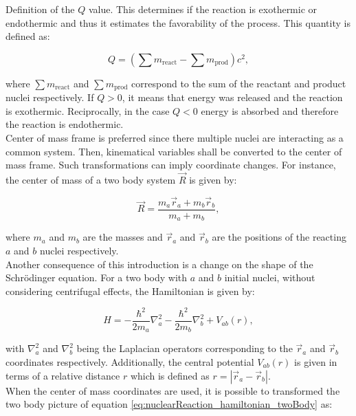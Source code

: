 \documentclass[openany]{book}
\begin{document}
Definition of the $Q$ value. This determines if the reaction is exothermic or endothermic and thus it estimates the favorability of the process. This quantity is defined as: 

\begin{equation}\label{eq:nuclearReaction_Qvalue}
	Q = (\sum m_{\mathrm{react}} - \sum m_{\mathrm{prod}})c^2,
\end{equation}

where $\sum m_{\mathrm{react}}$ and  $\sum m_{\mathrm{prod}}$ correspond to the sum of the reactant and product nuclei respectively. If $Q > 0$, it means that energy was released and the reaction is exothermic. Reciprocally, in the case $Q < 0$ energy is absorbed and therefore the reaction is endothermic.  \\

Center of mass frame is preferred since there multiple nuclei are interacting as a common system. Then, kinematical variables shall be converted to the center of mass frame. Such transformations can imply coordinate changes. For instance, the center of mass of a two body system $\vec R$ is given by: 

\begin{equation}\label{eq:nuclearReaction_centerOfMass}
	\vec R = \frac{m_a \vec r_a + m_b \vec r_b}{m_a + m_b},
\end{equation}

where $m_a$ and $m_b$ are the masses and $\vec r_a $ and $\vec r_b$ are the positions of the reacting $a$ and $b$ nuclei respectively. \\

Another consequence of this introduction is a change on the shape of the Schrödinger equation. For a two body with $a$ and $b$ initial nuclei, without considering centrifugal effects, the Hamiltonian is given by: 

\begin{equation}\label{eq:nuclearReaction_hamiltonian_twoBody}
	H = - \frac{\hbar^2}{2m_a} \nabla^2_a  - \frac{\hbar^2}{2m_b} \nabla^2_b + V_{ab}(r),
\end{equation}

with $\nabla^2_a$ and   $\nabla^2_b$ being the Laplacian operators corresponding to the  $\vec r_a $ and $\vec r_b$  coordinates respectively. Additionally, the central potential $ V_{ab}(r)$ is given in terms of a relative distance $r$ which is defined as $r = |\vec r_a - \vec r_b|$. \\

When the center of mass coordinates are used, it is possible to transformed the two body picture of equation \ref{eq:nuclearReaction_hamiltonian_twoBody} as: 
\end{document}
